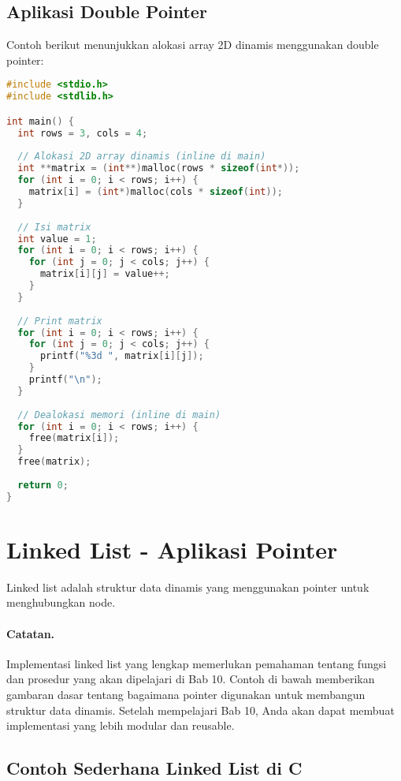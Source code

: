 \documentclass[../main.tex]{subfiles}
\begin{document}
\subsection{Aplikasi Double Pointer}

Contoh berikut menunjukkan alokasi array 2D dinamis menggunakan double pointer:

\begin{lstlisting}[language=C, caption={Double pointer untuk 2D array}]
#include <stdio.h>
#include <stdlib.h>

int main() {
  int rows = 3, cols = 4;
  
  // Alokasi 2D array dinamis (inline di main)
  int **matrix = (int**)malloc(rows * sizeof(int*));
  for (int i = 0; i < rows; i++) {
    matrix[i] = (int*)malloc(cols * sizeof(int));
  }
  
  // Isi matrix
  int value = 1;
  for (int i = 0; i < rows; i++) {
    for (int j = 0; j < cols; j++) {
      matrix[i][j] = value++;
    }
  }
  
  // Print matrix
  for (int i = 0; i < rows; i++) {
    for (int j = 0; j < cols; j++) {
      printf("%3d ", matrix[i][j]);
    }
    printf("\n");
  }
  
  // Dealokasi memori (inline di main)
  for (int i = 0; i < rows; i++) {
    free(matrix[i]);
  }
  free(matrix);
  
  return 0;
}
\end{lstlisting}

\section{Linked List - Aplikasi Pointer}

Linked list adalah struktur data dinamis yang menggunakan pointer untuk menghubungkan node.

\paragraph{Catatan.} Implementasi linked list yang lengkap memerlukan pemahaman tentang fungsi dan prosedur yang akan dipelajari di Bab 10. Contoh di bawah memberikan gambaran dasar tentang bagaimana pointer digunakan untuk membangun struktur data dinamis. Setelah mempelajari Bab 10, Anda akan dapat membuat implementasi yang lebih modular dan reusable.

\subsection{Contoh Sederhana Linked List di C}
\end{document}
